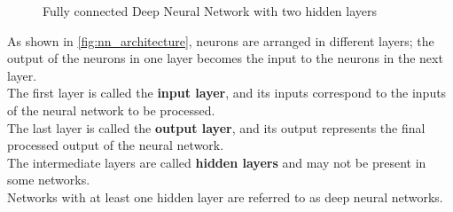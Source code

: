 \vspace{1em}
\begin{figure}[h!]

    \begin{center}

    \end{center}

    \caption{Fully connected Deep Neural Network with two hidden layers}
    \label{fig:nn_architecture}

\end{figure}

\noindent
As shown in \autoref{fig:nn_architecture}, neurons are arranged in different layers; the output of the neurons in one layer becomes the input to the neurons in the next layer. \\
The first layer is called the \textbf{input layer}, and its inputs correspond to the inputs of the neural network to be processed. \\
The last layer is called the \textbf{output layer}, and its output represents the final processed output of the neural network. \\
The intermediate layers are called \textbf{hidden layers} and may not be present in some networks. \\
Networks with at least one hidden layer are referred to as deep neural networks.

